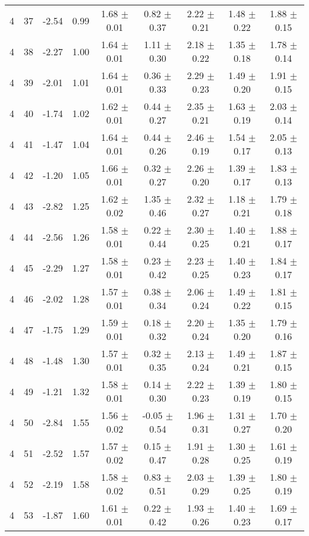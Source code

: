 \begin{landscape}
\begin{longtable}{ccccccccc}
   4 & 37 & -2.54 & 0.99 & 1.68 $\pm$ 0.01 & 0.82 $\pm$ 0.37 & 2.22 $\pm$ 0.21 & 1.48 $\pm$ 0.22 & 1.88 $\pm$ 0.15\\
   4 & 38 & -2.27 & 1.00 & 1.64 $\pm$ 0.01 & 1.11 $\pm$ 0.30 & 2.18 $\pm$ 0.22 & 1.35 $\pm$ 0.18 & 1.78 $\pm$ 0.14\\
   4 & 39 & -2.01 & 1.01 & 1.64 $\pm$ 0.01 & 0.36 $\pm$ 0.33 & 2.29 $\pm$ 0.23 & 1.49 $\pm$ 0.20 & 1.91 $\pm$ 0.15\\
   4 & 40 & -1.74 & 1.02 & 1.62 $\pm$ 0.01 & 0.44 $\pm$ 0.27 & 2.35 $\pm$ 0.21 & 1.63 $\pm$ 0.19 & 2.03 $\pm$ 0.14\\
   4 & 41 & -1.47 & 1.04 & 1.64 $\pm$ 0.01 & 0.44 $\pm$ 0.26 & 2.46 $\pm$ 0.19 & 1.54 $\pm$ 0.17 & 2.05 $\pm$ 0.13\\
   4 & 42 & -1.20 & 1.05 & 1.66 $\pm$ 0.01 & 0.32 $\pm$ 0.27 & 2.26 $\pm$ 0.20 & 1.39 $\pm$ 0.17 & 1.83 $\pm$ 0.13\\
   4 & 43 & -2.82 & 1.25 & 1.62 $\pm$ 0.02 & 1.35 $\pm$ 0.46 & 2.32 $\pm$ 0.27 & 1.18 $\pm$ 0.21 & 1.79 $\pm$ 0.18\\
   4 & 44 & -2.56 & 1.26 & 1.58 $\pm$ 0.01 & 0.22 $\pm$ 0.44 & 2.30 $\pm$ 0.25 & 1.40 $\pm$ 0.21 & 1.88 $\pm$ 0.17\\
   4 & 45 & -2.29 & 1.27 & 1.58 $\pm$ 0.01 & 0.23 $\pm$ 0.42 & 2.23 $\pm$ 0.25 & 1.40 $\pm$ 0.23 & 1.84 $\pm$ 0.17\\
   4 & 46 & -2.02 & 1.28 & 1.57 $\pm$ 0.01 & 0.38 $\pm$ 0.34 & 2.06 $\pm$ 0.24 & 1.49 $\pm$ 0.22 & 1.81 $\pm$ 0.15\\
   4 & 47 & -1.75 & 1.29 & 1.59 $\pm$ 0.01 & 0.18 $\pm$ 0.32 & 2.20 $\pm$ 0.24 & 1.35 $\pm$ 0.20 & 1.79 $\pm$ 0.16\\
   4 & 48 & -1.48 & 1.30 & 1.57 $\pm$ 0.01 & 0.32 $\pm$ 0.35 & 2.13 $\pm$ 0.24 & 1.49 $\pm$ 0.21 & 1.87 $\pm$ 0.15\\
   4 & 49 & -1.21 & 1.32 & 1.58 $\pm$ 0.01 & 0.14 $\pm$ 0.30 & 2.22 $\pm$ 0.23 & 1.39 $\pm$ 0.19 & 1.80 $\pm$ 0.15\\
   4 & 50 & -2.84 & 1.55 & 1.56 $\pm$ 0.02 & -0.05 $\pm$ 0.54 & 1.96 $\pm$ 0.31 & 1.31 $\pm$ 0.27 & 1.70 $\pm$ 0.20\\
   4 & 51 & -2.52 & 1.57 & 1.57 $\pm$ 0.02 & 0.15 $\pm$ 0.47 & 1.91 $\pm$ 0.28 & 1.30 $\pm$ 0.25 & 1.61 $\pm$ 0.19\\
   4 & 52 & -2.19 & 1.58 & 1.58 $\pm$ 0.02 & 0.83 $\pm$ 0.51 & 2.03 $\pm$ 0.29 & 1.39 $\pm$ 0.25 & 1.80 $\pm$ 0.19\\
   4 & 53 & -1.87 & 1.60 & 1.61 $\pm$ 0.01 & 0.22 $\pm$ 0.42 & 1.93 $\pm$ 0.26 & 1.40 $\pm$ 0.23 & 1.69 $\pm$ 0.17\\

\end{longtable}
\end{landscape}
